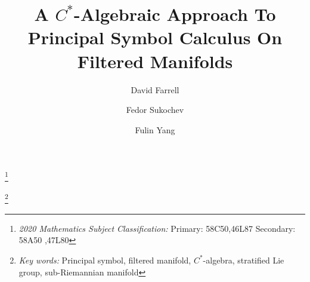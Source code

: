 \documentclass[leqno]{amsart}
\begin{document}
	
\newcommand{\quasiriesz}[2]{\R^{#1}_{#2}}
\newcommand{\co}{\mathrm}
\newcommand{\gra}[2]{\smash{\g^{#2}_{#1}}}
\newcommand{\named}{Jacobian\xspace}
\newcommand{\conamed}{Euclidean\xspace}
\newcommand{\itemcase}[1]{\uppercase{#1}}
\newcommand{\Jdet}[1]{\mathrm J_{#1}}


\def\Span{\operatorname{Span}\,}
\def\Lie{\operatorname{Lie}\,}
\def\Ord{\operatorname{Ord}\,}
\def\Id{\operatorname{Id}\,}
	\def\dim{\operatorname{dim}\,}
	\def\p{\partial}
	\def\rp{ ^{-1} }
	\def\rn{\mathbb{R}^{d}}
	\def\sn{\mathbb{S}^{d-1}}
	\def\Exp{\operatorname{\rm Exp}}
	\def\one{\mathbf 1}
	\def\unit{\mathbbm 1}
	\def\id{{\rm id}}
	\def\supp{{\rm supp}}
	\def\ri{{\rm i}}
	
	\def\po{\pi_{1}}
	\def\pt{\pi_{2}}
	\def\vn{{\rm VN}(\GG)}
	\def\vh{{\rm VN_{hom}}(\GG)}
	\def\sym{{\rm sym}}
	\def\aut{\rm Aut}
	\def\cci{C_{c}^{\infty}(\GG)}
	\def\gl{{\rm GL}(d,\RR)}
	\def\glo{{\rm GL}(n_{1},\RR)}
	\def\at{{\rm Aut^{\delta}}(\GG)}
	\def\diag{{\rm diag}}
	\def\cca{C^{\infty}(\GG;\at)}
	\def\BMO{{\rm BMO}(\GG)}
	\def\sgm{\dot{W}^{1,Q}(\GG;\MM_{n_{1}})}
	\def\gln{{\rm GL}(n,\RR)}
	\def\sgn{\dot{W}^{1,Q}(\GG;\MM_{n})}
	\def\ov{\overline}
	\def\Ext{{\rm Ext}}
	\def\Rest{{\rm Rest}}
	
	\def\homo{{\rm hom}}
	\def\Homo{{\rm Hom}}
	\newcommand{\Borel}{\mathfrak M}
	\newcommand{\norm}[1]{\left\lVert#1\right\rVert}
	
	
	
	
	
	
	\title{A $C^{*}$-Algebraic Approach To Principal Symbol Calculus On Filtered Manifolds}
	
	\thanks{{\it 2020 Mathematics Subject Classification:} Primary: 58C50,46L87  Secondary: 58A50 ,47L80 }
	
	\thanks{{\it Key words:} Principal symbol, filtered manifold, $C^{*}$-algebra, stratified Lie group, sub-Riemannian manifold}
	
	
	
	
	\author{David Farrell}
	\address{School of Mathematics and Statistics, UNSW, Kensington, NSW 2052, Australia}
	
	
	
	\author{Fedor Sukochev}
	\address{School of Mathematics and Statistics, UNSW, Kensington, NSW 2052, Australia}
	
	
	
	\author{Fulin Yang}
	\address{Institute for Advanced Study in Mathematics, Harbin Institute of Technology, Harbin 150001, China}
	
\end{document}
